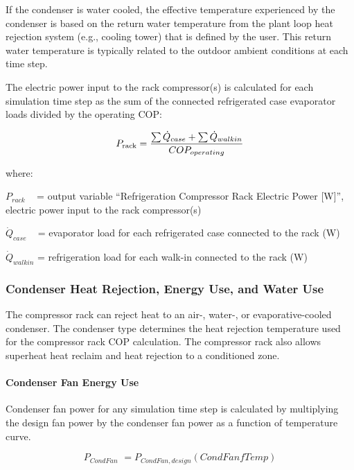 If the condenser is water cooled, the effective temperature experienced by the condenser is based on the return water temperature from the plant loop heat rejection system (e.g., cooling tower) that is defined by the user. This return water temperature is typically related to the outdoor ambient conditions at each time step.

The electric power input to the rack compressor(s) is calculated for each simulation time step as the sum of the connected refrigerated case evaporator loads divided by the operating COP:

\begin{equation}
{P_{{\rm{rack}}}} = \frac{{\sum {{{\dot Q}_{case}} + \sum {{{\dot Q}_{walkin}}} } }}{{CO{P_{operating}}}}
\end{equation}

where:

\({P_{rack}}\) ~ = output variable ``Refrigeration Compressor Rack Electric Power {[}W{]}'', electric power input to the rack compressor(s)

\({\dot Q_{case}}\) ~ = evaporator load for each refrigerated case connected to the rack (W)

\({\dot Q_{walkin}}\) = refrigeration load for each walk-in connected to the rack (W)

\subsubsection{Condenser Heat Rejection, Energy Use, and Water Use}\label{condenser-heat-rejection-energy-use-and-water-use}

The compressor rack can reject heat to an air-, water-, or evaporative-cooled condenser. The condenser type determines the heat rejection temperature used for the compressor rack COP calculation. The compressor rack also allows superheat heat reclaim and heat rejection to a conditioned zone.

\paragraph{Condenser Fan Energy Use}\label{condenser-fan-energy-use}

Condenser fan power for any simulation time step is calculated by multiplying the design fan power by the condenser fan power as a function of temperature curve.

\begin{equation}
{P_{CondFan}}\,\, = {P_{CondFan,design}}\left( {CondFanfTemp} \right)
\end{equation}

